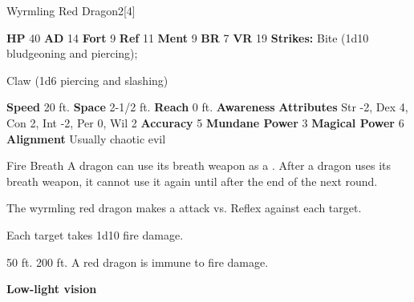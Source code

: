       
  \begin{monsubsection}{Wyrmling Red Dragon}{2}[4]
    \vspace{-1em}\vspace{-1em}
    \vspace{0em}

    
    

    \begin{spellcontent}
      \begin{spelltargetinginfo}
        \pari \textbf{HP} 40 \monsep
          \textbf{AD} 14 \monsep
          \textbf{Fort} 9 \monsep
          \textbf{Ref} 11 \monsep
          \textbf{Ment} 9
        \pari \textbf{BR} 7 \monsep
        \textbf{VR} 19
        \pari \textbf{Strikes:}
            Bite  (1d10 bludgeoning and piercing);
\par Claw  (1d6 piercing and slashing)
      \end{spelltargetinginfo}
    \end{spellcontent}
    \begin{monsterfooter}
      \pari \textbf{Speed} 20 ft. \monsep
        \textbf{Space} 2-1/2 ft. \monsep
        \textbf{Reach} 0 ft.
      \pari \textbf{Awareness} 
      \pari \textbf{Attributes}
        Str -2, Dex 4,
        Con 2, Int -2,
        Per 0, Wil 2
      \pari \textbf{Accuracy} 5 \monsep
        \textbf{Mundane Power} 3 \monsep
      \textbf{Magical Power} 6
      \pari \textbf{Alignment} Usually chaotic evil
    \end{monsterfooter}
  \end{monsubsection}
  \begin{freeability}{Fire Breath}
      A dragon can use its breath weapon as a .
      After a dragon uses its breath weapon, it cannot use it again until after the end of the next round.
      \par The wyrmling red dragon makes a  attack
        vs. Reflex against each target.
    
    \hit Each target takes 1d10 fire damage.
    \end{freeability}
  
      
       50 ft.
     200 ft.
     A red dragon is immune to fire damage.
    \par\noindent\textbf{Low-light vision}
  

